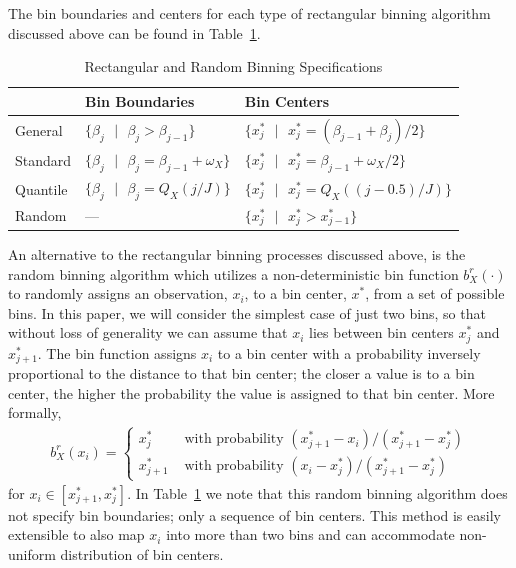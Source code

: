 \documentclass[11pt]{isuthesis}\usepackage[]{graphicx}\usepackage[]{color}
\begin{document}
The bin boundaries and centers for each type of rectangular binning algorithm discussed above can be found in Table~\ref{tab:rectbinning}.
 
\begin{table}[hbtp]
\centering
\begin{tabular}{lll} \hline
 & Bin Boundaries & Bin Centers \\ 
 \hline  
General &  $ \{\beta_j \text{ }|\text{ } \beta_j > \beta_{j-1} \} $ & $\{x_j^\ast \text{ }|\text{ } x_j^\ast = (\beta_{j-1}+ \beta_j)/2 \}$ \\
Standard \hspace{0.5cm} & $ \{\beta_j \text{ }|\text{ } \beta_j = \beta_{j-1} + \omega_X \} $\hspace{0.5cm} & $\{x_j^\ast \text{ }|\text{ } x_j^\ast = \beta_{j-1} + \omega_X/2 \}$ \\
Quantile & $ \{\beta_j \text{ }|\text{ } \beta_j = Q_X(j/J) \} $  & $\{x_j^\ast \text{ }|\text{ } x_j^\ast = Q_X((j-0.5)/J) \}$ \\
Random &  ---  & $\{x_j^\ast \text{ }|\text{ } x_j^\ast > x_{j-1}^\ast \}$  \\
\hline
\end{tabular}
\caption{Rectangular and Random Binning Specifications}
\label{tab:rectbinning}
\end{table}
%
An alternative to the rectangular binning processes discussed above, is the random binning algorithm which utilizes a non-deterministic bin function $b^r_X(\cdot)$ to randomly assigns an observation, $x_i$, to a bin center, $x^\ast$, from a set of possible bins. In this paper, we will consider the simplest case of just two bins, so that without loss of generality we can assume that $x_i$ lies between bin centers $x^\ast_j$ and $x^\ast_{j+1}$. The bin function assigns $x_i$ to a bin center with a probability inversely proportional to the distance to that bin center; the closer a value is to a bin center, the higher the probability the value is assigned to that bin center. More formally,
%
\begin{eqnarray}\label{randbin1}
b^r_X(x_i) = \left\{\begin{array}{ll} 
  x^\ast_j & \text{ with probability } (x^\ast_{j+1} - x_i)/(x^\ast_{j+1} -x^\ast_{j}) \\
  x^\ast_{j+1} &\text{ with probability }  (x_i - x^\ast_{j})/(x^\ast_{j+1} -x^\ast_{j})
  \end{array}\right.
\end{eqnarray}  
%
for $x_i \in [x^\ast_{j+1}, x^\ast_{j}]$. In Table~\ref{tab:rectbinning} we note that this random binning algorithm does not specify bin boundaries; only a sequence of bin centers.  This method is easily extensible to also map $x_i$ into more than two bins and can accommodate non-uniform distribution of bin centers.  
\end{document}
